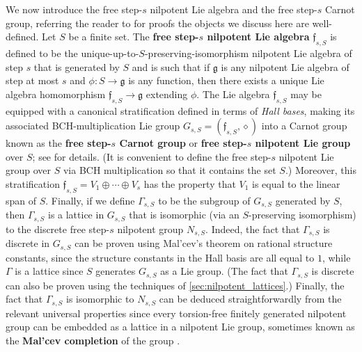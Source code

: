 \documentclass[11pt]{article}
\numberwithin{equation}{section}
\theoremstyle{plain}
\theoremstyle{definition}
\theoremstyle{remark}
\numberwithin{equation}{section}
\numberwithin{equation}{section}
\begin{document}
We now introduce the free step-$s$ nilpotent Lie algebra and the free step-$s$ Carnot group, referring the reader to \cite[Chapter 14.1]{bonfiglioli2007stratified} for proofs the objects we discuss here are well-defined.
Let $S$ be a finite set. The \textbf{free step-$s$ nilpotent Lie algebra} $\mathfrak{f}_{s,S}$ is defined to be the unique-up-to-$S$-preserving-isomorphism nilpotent Lie algebra of step $s$ that is generated by $S$ and is such that if $\mathfrak{g}$ is any nilpotent Lie algebra of step at most $s$ and $\phi:S\to \mathfrak{g}$ is any function, then there exists a unique Lie algebra homomorphism $\mathfrak{f}_{s,S}\to \mathfrak{g}$ extending $\phi$. The 
%
 Lie algebra $\mathfrak{f}_{s,S}$ may be
   equipped with a canonical stratification defined in terms of \emph{Hall bases}, making its associated BCH-multiplication Lie group $G_{s,S}=(\mathfrak{f}_{s,S},\diamond)$ into a Carnot group known as the \textbf{free step-$s$ Carnot group} or \textbf{free step-$s$ nilpotent Lie group} over $S$; see \cite[Chapters 14.1 and 14.2]{bonfiglioli2007stratified} for details. (It is convenient to define the free step-$s$ nilpotent Lie group over $S$ via BCH multiplication so that it contains the set $S$.) Moreover, this stratification $\mathfrak{f}_{s,S}=V_1 \oplus \cdots \oplus V_s$ has the property that $V_1$ is equal to the linear span of $S$. Finally, if we define $\Gamma_{s,S}$ to be the subgroup of $G_{s,S}$ generated by $S$, then $\Gamma_{s,S}$ is a lattice in $G_{s,S}$ that is isomorphic (via an $S$-preserving isomorphism) to the discrete free step-$s$ nilpotent group $N_{s,S}$. Indeed, the fact that $\Gamma_{s,S}$ is discrete in $G_{s,S}$ can be proven using Mal'cev's theorem on rational structure constants, since the structure constants in the Hall basis are all equal to $1$, while $\Gamma$ is a lattice since $S$ generates $G_{s,S}$ as a Lie group. (The fact that $\Gamma_{s,S}$ is discrete can also be proven using the techniques of \cref{sec:nilpotent_lattices}.) Finally, the fact that $\Gamma_{s,S}$ is isomorphic to $N_{s,S}$ can be deduced straightforwardly from the relevant universal properties since every torsion-free finitely generated nilpotent group can be embedded as a lattice in a nilpotent Lie group, sometimes known as the \textbf{Mal'cev completion} of the group \cite[Theorem 2.18]{raghunathan1972discrete}.

\medskip
\end{document}
